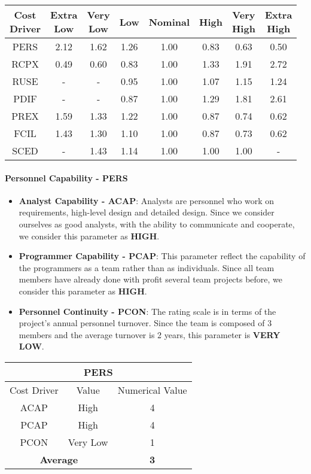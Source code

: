 \begin{longtable}{c|ccccccc}
\toprule
\specialcell{Cost\\Driver}&\specialcell{Extra\\Low}&\specialcell{Very\\Low}&Low&Nominal&High&\specialcell{Very\\High}&\specialcell{Extra\\High}\\
\midrule
PERS &2.12 &1.62 &1.26 &1.00 &0.83 &0.63 &0.50\\
RCPX &0.49 &0.60 &0.83 &1.00 &1.33 &1.91 &2.72\\
RUSE &-	   &-	 &0.95 &1.00 &1.07 &1.15 &1.24\\
PDIF &-	   &-    &0.87 &1.00 &1.29 &1.81 &2.61\\
PREX &1.59 &1.33 &1.22 &1.00 &0.87 &0.74 &0.62\\
FCIL &1.43 &1.30 &1.10 &1.00 &0.87 &0.73 &0.62\\
SCED &-	   &1.43 &1.14 &1.00 &1.00 &1.00 &-\\
\bottomrule
\end{longtable}

\paragraph{Personnel Capability - PERS}
\begin{itemize}
	\item \textbf{Analyst Capability - ACAP}: Analysts are personnel who work on requirements, high-level design and detailed design. Since we consider ourselves as good analysts, with the ability to communicate and cooperate, we consider this parameter as \textbf{HIGH}.
	\item \textbf{Programmer Capability - PCAP}: This parameter reflect the capability of the programmers as a team rather than as individuals. Since all team members have already done with profit several team projects before, we consider this parameter as \textbf{HIGH}.
	\item \textbf{Personnel Continuity - PCON}: The rating scale is in terms of the project’s annual personnel turnover. Since the team is composed of 3 members and the average turnover is 2 years, this parameter is \textbf{VERY LOW}.
\end{itemize}

\begin{longtable}{ccc}
\multicolumn{3}{c}{\textbf{PERS}}\\
\toprule
Cost Driver&Value&Numerical Value\\
\midrule
ACAP&High&4\\
PCAP&High&4\\
PCON&Very Low&1\\
\midrule
\multicolumn{2}{c}{\textbf{Average}}&\textbf{3}\\
\bottomrule
\end{longtable}

